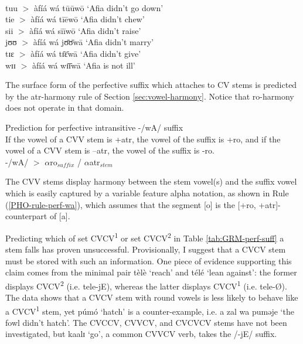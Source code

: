 \begin{exe}
\begin{exe}
\begin{exe}
{\begin{exe}
\begin{exe}
\begin{exe}
\begin{exe}
\begin{exe}
\begin{exe}
\begin{exe}
\begin{exe}
\begin{exe}
\begin{exe}
\begin{exe}
\begin{exe}
\begin{exe}
\begin{exe}
\begin{exe}
\begin{exe}
\begin{exe}
\begin{exe}
\begin{exe}
\\
tuu $>$ àfíá wá  tūūwō   {\rm `Afia didn't  go down'}\\
tie $>$  àfíá wá   tīēwō {\rm `Afia didn't chew'}\\
sii  $>$  àfíá wá  sīīwō   {\rm  `Afia didn't  raise'}\\
jʊʊ   $>$  àfíá wá  jʊ̄ʊ̄wā  {\rm  `Afia didn't  marry'}\\
tɪɛ $>$  àfíá wá tɪ̄ɛ̄wā  {\rm  `Afia didn't  give'}\\
wɪɪ $>$  àfíá wá  wɪ̄ɪ̄wā  {\rm  `Afia is not  ill'}
 

\z 
 \z

The surface form of the perfective suffix which attaches to CV stems  is 
predicted by the {\sc atr}-harmony rule of Section
\ref{sec:vowel-harmony}. Notice that  {\sc ro}-harmony does not operate
in that domain. 

\begin{Rule}\label{PHO-rule-perf-wa}{Prediction  for perfective intransitive 
-/wA/ suffix}\\
If the vowel of a CVV stem is
{\sc +atr},
the vowel of the suffix is {\sc +ro}, and if the vowel of a CVV stem is {\sc
 --atr}, the vowel of the suffix is {\sc -ro}.\\
-/wA/ $>$  $\alpha${\sc ro}$_{suffix}$  /  $\alpha${\sc atr}$_{stem}$   
\end{Rule}

The CVV stems display  harmony between the stem
vowel(s) and the suffix vowel which is easily captured by a variable feature
alpha notation, as shown in Rule (\ref{PHO-rule-perf-wa}), which  assumes that 
the segment [{\sls o}] is the
[{\sc +ro, +atr}]-counterpart of [{\sls a}]. 




Predicting  which of 
set CVCV\textsuperscript{1} or set CVCV\textsuperscript{2} in Table 
\ref{tab:GRM-perf-suff}  a
stem falls  has proven unsuccessful. Provisionally,  I suggest that a CVCV
stem must be stored with such an information. One piece of evidence
supporting this claim comes from
the minimal pair {\sls tèlè} `reach' and  {\sls télé} `lean against':  the
former displays CVCV\textsuperscript{2} (i.e. tele-jE),  whereas the latter 
displays CVCV\textsuperscript{1}
(i.e. tele-\O).  The data shows that a  CVCV stem with round vowels is less 
likely to
behave like a CVCV\textsuperscript{1} stem, yet {\sls púmó} `hatch' is a 
counter-example, i.e.
{\sls a zal wa puməje} `the fowl didn't hatch'. The CVCCV, CVVCV, and CVCVCV 
stems
have  not been investigated, but {\sls kaalɪ} `go', a common  CVVCV verb, takes
the
/-jE/ suffix.  



\end{exe}
\end{exe}
\end{exe}
\end{exe}
\end{exe}
\end{exe}
\end{exe}
\end{exe}
\end{exe}
\end{exe}
\end{exe}
\end{exe}
\end{exe}
\end{exe}
\end{exe}
\end{exe}
\end{exe}
\end{exe}
\end{exe}}
\end{exe}
\end{exe}
\end{exe}
